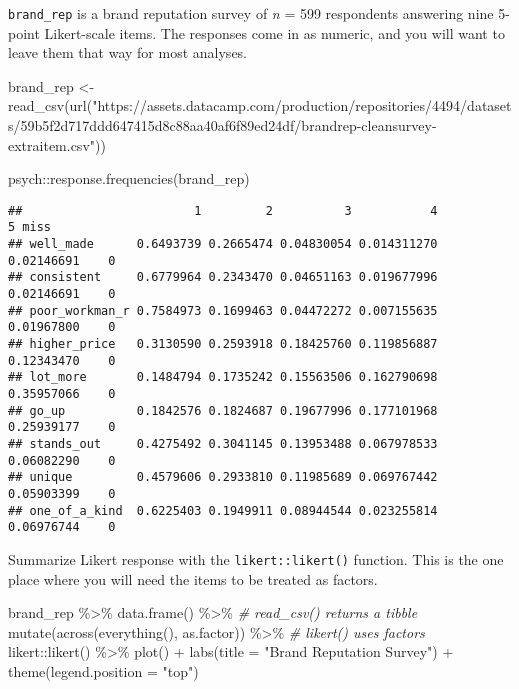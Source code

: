 \documentclass[
]{book}
\newenvironment{Shaded}{\begin{snugshade}}{\end{snugshade}}
\newcommand{\AttributeTok}[1]{\textcolor[rgb]{0.77,0.63,0.00}{#1}}
\newcommand{\CommentTok}[1]{\textcolor[rgb]{0.56,0.35,0.01}{\textit{#1}}}
\newcommand{\FunctionTok}[1]{\textcolor[rgb]{0.00,0.00,0.00}{#1}}
\newcommand{\NormalTok}[1]{#1}
\newcommand{\OtherTok}[1]{\textcolor[rgb]{0.56,0.35,0.01}{#1}}
\newcommand{\SpecialCharTok}[1]{\textcolor[rgb]{0.00,0.00,0.00}{#1}}
\newcommand{\StringTok}[1]{\textcolor[rgb]{0.31,0.60,0.02}{#1}}
\theoremstyle{definition}
\theoremstyle{definition}
\theoremstyle{definition}
\theoremstyle{definition}
\theoremstyle{remark}
\begin{document}
\texttt{brand\_rep} is a brand reputation survey of \emph{n} = 599 respondents answering nine 5-point Likert-scale items. The responses come in as numeric, and you will want to leave them that way for most analyses.

\begin{Shaded}
\begin{Highlighting}[]
\NormalTok{brand\_rep }\OtherTok{\textless{}{-}} \FunctionTok{read\_csv}\NormalTok{(}\FunctionTok{url}\NormalTok{(}\StringTok{"https://assets.datacamp.com/production/repositories/4494/datasets/59b5f2d717ddd647415d8c88aa40af6f89ed24df/brandrep{-}cleansurvey{-}extraitem.csv"}\NormalTok{))}

\NormalTok{psych}\SpecialCharTok{::}\FunctionTok{response.frequencies}\NormalTok{(brand\_rep)}
\end{Highlighting}
\end{Shaded}

\begin{verbatim}
##                        1         2          3           4          5 miss
## well_made      0.6493739 0.2665474 0.04830054 0.014311270 0.02146691    0
## consistent     0.6779964 0.2343470 0.04651163 0.019677996 0.02146691    0
## poor_workman_r 0.7584973 0.1699463 0.04472272 0.007155635 0.01967800    0
## higher_price   0.3130590 0.2593918 0.18425760 0.119856887 0.12343470    0
## lot_more       0.1484794 0.1735242 0.15563506 0.162790698 0.35957066    0
## go_up          0.1842576 0.1824687 0.19677996 0.177101968 0.25939177    0
## stands_out     0.4275492 0.3041145 0.13953488 0.067978533 0.06082290    0
## unique         0.4579606 0.2933810 0.11985689 0.069767442 0.05903399    0
## one_of_a_kind  0.6225403 0.1949911 0.08944544 0.023255814 0.06976744    0
\end{verbatim}

Summarize Likert response with the \texttt{likert::likert()} function. This is the one place where you will need the items to be treated as factors.

\begin{Shaded}
\begin{Highlighting}[]
\NormalTok{brand\_rep }\SpecialCharTok{\%\textgreater{}\%}
  \FunctionTok{data.frame}\NormalTok{() }\SpecialCharTok{\%\textgreater{}\%} \CommentTok{\# read\_csv() returns a tibble}
  \FunctionTok{mutate}\NormalTok{(}\FunctionTok{across}\NormalTok{(}\FunctionTok{everything}\NormalTok{(), as.factor)) }\SpecialCharTok{\%\textgreater{}\%}  \CommentTok{\# likert() uses factors}
\NormalTok{  likert}\SpecialCharTok{::}\FunctionTok{likert}\NormalTok{() }\SpecialCharTok{\%\textgreater{}\%}
  \FunctionTok{plot}\NormalTok{() }\SpecialCharTok{+} 
  \FunctionTok{labs}\NormalTok{(}\AttributeTok{title =} \StringTok{"Brand Reputation Survey"}\NormalTok{) }\SpecialCharTok{+}
  \FunctionTok{theme}\NormalTok{(}\AttributeTok{legend.position =} \StringTok{"top"}\NormalTok{)}
\end{Highlighting}
\end{Shaded}
\end{document}
